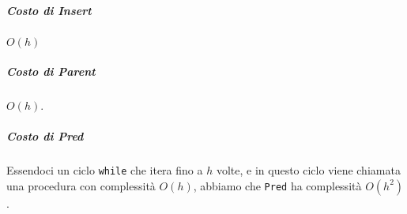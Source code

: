 \subparagraph{Costo di Insert} $O(h)$





\subparagraph{Costo di Parent} $O(h)$.



\subparagraph{Costo di Pred} Essendoci un ciclo \texttt{while} che itera fino a
$h$ volte, e in questo ciclo viene chiamata una procedura con complessità $O(h)$,
abbiamo che \texttt{Pred} ha complessità $O(h^2)$.